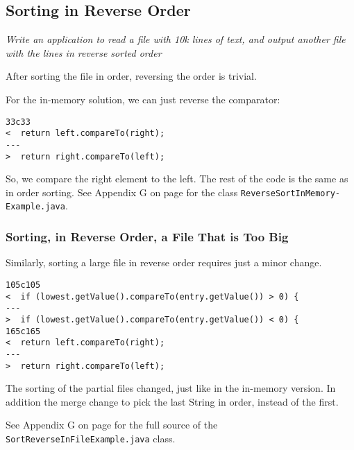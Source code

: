 \subsection{Sorting in Reverse Order}
\textit{Write an application to read a file with 10k lines of text, and output another file with the lines in reverse sorted order}

After sorting the file in order, reversing the order is trivial.

For the in-memory solution, we can just reverse the comparator:

\begin{lstlisting}
33c33
<  return left.compareTo(right);
---
>  return right.compareTo(left);

\end{lstlisting}
So, we compare the right element to the left. The rest of the code is the same as in order sorting. See Appendix G on page \pageref{App:AppendixG} for the class \texttt{ReverseSortInMemory\hyp{}Example.java}.

\subsubsection{Sorting, in Reverse Order, a File That is Too Big}
Similarly, sorting a large file in reverse order requires just a minor change.

\begin{lstlisting}
105c105
<  if (lowest.getValue().compareTo(entry.getValue()) > 0) {
---
>  if (lowest.getValue().compareTo(entry.getValue()) < 0) {
165c165
<  return left.compareTo(right);
---
>  return right.compareTo(left);

\end{lstlisting}

The sorting of the partial files changed, just like in the in-memory version. In addition the merge change to pick the last String in order, instead of the first.

See Appendix G on page \pageref{App:AppendixG} for the full source of the \texttt{SortReverseInFileExample.java} class.